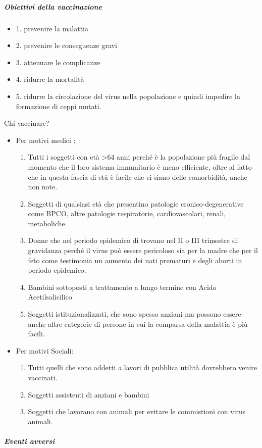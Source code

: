 \subparagraph{Obiettivi della vaccinazione}
\begin{itemize}

\item 
1. prevenire la malattia
\item 
2. prevenire le conseguenze gravi
\item 
3. attenuare le complicanze
\item 
4. ridurre la mortalità
\item 
5. ridurre la circolazione del virus nella popolazione e quindi impedire
la formazione di ceppi mutati.
\end{itemize}
Chi vaccinare?
\begin{itemize}
\item 
  Per motivi medici :
\begin{enumerate}

\item  Tutti i soggetti con età \textgreater{}64 anni perché è la
popolazione più fragile dal momento che il loro sistema immunitario è
meno efficiente, oltre al fatto che in questa fascia di età è facile che
ci siano delle comorbidità, anche non note.

\item  Soggetti di qualsiasi età che presentino patologie
cronico-degenerative come BPCO, altre patologie respiratorie,
cardiovascolari, renali, metaboliche.

\item  Donne che nel periodo epidemico di trovano nel II o III trimestre di
gravidanza perché il virus può essere pericoloso sia per la madre che
per il feto come testimonia un aumento dei nati prematuri e degli aborti
in periodo epidemico.

\item  Bambini sottoposti a trattamento a lungo termine con Acido
Acetilsalicilico

\item  Soggetti istituzionalizzati, che sono spesso anziani ma possono
essere anche altre categorie di persone in cui la comparsa della
malattia è più facili.\end{enumerate}
\item 
  Per motivi Sociali:
\begin{enumerate}

\item Tutti quelli che sono addetti a lavori di pubblica utilità dovrebbero
venire vaccinati.

\item Soggetti assistenti di anziani e bambini

\item Soggetti che lavorano con animali per evitare le commistioni con
virus animali.\end{enumerate}
\end{itemize}
\subparagraph{Eventi avversi}


